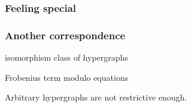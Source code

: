 \begin{frame}
    \frametitle{Feeling special}

    \centering


\end{frame}
\begin{frame}
    \frametitle{Another correspondence}

    \centering

    \begin{minipage}{0.45\textwidth}
        \begin{center}
            isomorphism class of hypergraphs

            \vspace{1em}

        \end{center}
    \end{minipage}
    \quad
    \raisebox{-1em}{\(\leftrightarrow\)}
    \pause
    \begin{minipage}{0.45\textwidth}
        \begin{center}
            Frobenius term modulo equations

            \vspace{1em}

        \end{center}
    \end{minipage}

    \vspace{1em}
    \normalsize
    \scalebox{0.75}{\hypergraphpeople}

    \Large
    \pause
    Arbitrary hypergraphs are \alert{not restrictive enough}.
\end{frame}
